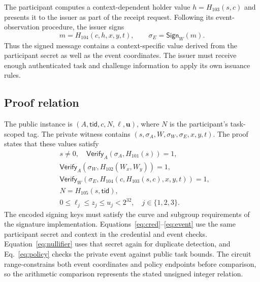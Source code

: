 \documentclass[pdflatex,iicol,sn-mathphys-num]{sn-jnl}
\begin{document}
The participant computes a context-dependent holder value $h=H_{103}(s,c)$ and presents it to the issuer as part of the receipt request. Following its event-observation procedure, the issuer signs
\begin{equation}
 m=H_{104}(c,h,x,y,t), \qquad \sigma_E=\mathsf{Sign}_{W}(m).
 \label{eq:receipt}
\end{equation}
Thus the signed message contains a context-specific value derived from the participant secret as well as the event coordinates. The issuer must receive enough authenticated task and challenge information to apply its own issuance rules.

\subsection{Proof relation}
\label{sec:relation}

The public instance is $(A,\mathsf{tid},c,N,\boldsymbol{\ell},\boldsymbol u)$, where $N$ is the participant's task-scoped tag. The private witness contains $(s,\sigma_A,W,\sigma_W,\sigma_E,x,y,t)$. The proof states that these values satisfy
\begin{align}
 &s\ne 0, \quad \mathsf{Verify}_A(\sigma_A,H_{101}(s))=1,\label{eq:cred}\\
 &\mathsf{Verify}_A(\sigma_W,H_{102}(W_x,W_y))=1,\label{eq:issuer}\\
 &\mathsf{Verify}_W\!\left(\sigma_E,H_{104}(c,H_{103}(s,c),x,y,t)\right)=1,\label{eq:event}\\
 &N=H_{105}(s,\mathsf{tid}),\label{eq:nullifier}\\
 &0\leq \ell_j\leq z_j\leq u_j<2^{32},\quad j\in\{1,2,3\}.
 \label{eq:policy}
\end{align}
The encoded signing keys must satisfy the curve and subgroup requirements of the signature implementation. Equations~\eqref{eq:cred}--\eqref{eq:event} use the same participant secret and context in the credential and event checks. Equation~\eqref{eq:nullifier} uses that secret again for duplicate detection, and Eq.~\eqref{eq:policy} checks the private event against public task bounds. The circuit range-constrains both event coordinates and policy endpoints before comparison, so the arithmetic comparison represents the stated unsigned integer relation.
\end{document}
